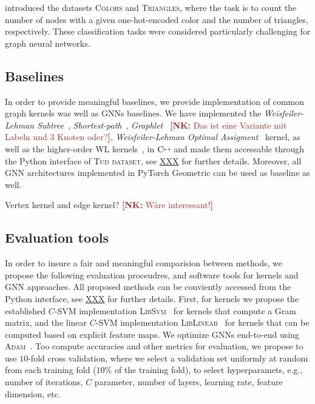 \documentclass{article}
\theoremstyle{definition}
\newcommand{\new}[1]{\emph{#1}}
\newcommand{\nk}[1]{{{\textcolor{brown}{\textbf{[NK:} {#1}\textbf{]}}}}}
\newcommand{\CPP}[1][]{$\text{C\hspace{-.25ex}}^{_{_{_{++}}}}
	\ifthenelse{\equal{#1}{}}{}{\text{\hspace{-.625ex}#1}}$}
\begin{document}
\citet{Knyazev2019} introduced the datasets \textsc{Colors} and \textsc{Triangles}, where the task is to count the number of nodes with a given one-hot-encoded color and the number of triangles, respectively. These classification tasks were considered particularly challenging for graph neural networks.

\subsection{Baselines}

In order to provide meaningful baselines, we provide implementation of common graph kernels was well as GNNs baselines. We have implemented the \new{Weisfeiler-Lehman Subtree}~\cite{She+2011}, \new{Shortest-path}~\cite{Bor+2005}, \new{Graphlet}~\cite{She+2009} \nk{Das ist eine Variante mit Labeln und 3 Knoten oder?}, \new{Weisfeiler-Lehman Optimal Assigment}~\cite{Kri+2016} kernel, as well as the higher-order WL kernels~\cite{Mor+2019b}, in \CPP and made them accessable through the Python interface of \textsc{Tud dataset}, see \url{XXX} for further details.  Moreover, all GNN architectures implemented in PyTorch Geometric can be used as baseline as well. 

Vertex kernel and edge kernel? \nk{Wäre interessant!}


\subsection{Evaluation tools}\label{eval}

In order to insure a fair and meaningful comparision between methods, we propose the following evaluation proceudres, and software tools for kernels and GNN approaches. All proposed methods can be conviently accessed from the Python interface, see \url{XXX} for further details. First, for kernels we propose the established $C$-SVM implementation \textsc{LibSvm}~\cite{Cha+11} for kernels that compute a Gram matrix, and the linear $C$-SVM implementation \textsc{LibLinear}~\cite{Fan+2008} for kernels  that can be computed based on explicit feature maps. We optimize GNNs end-to-end using \textsc{Adam}~\cite{}. Too compute accuracies and other metrics for evaluation, we propose to use $10$-fold cross validation, where we select a validation set uniformly at random from each training fold ($10\%$ of the training fold), to select hyperparamets, e.g., number of iterations, $C$ parameter, number of layers, learning rate, feature dimension, etc.  
\end{document}
